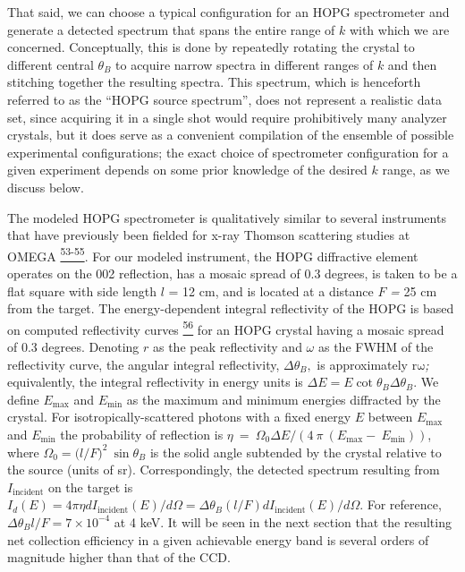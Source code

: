 That said, we can choose a typical configuration for an HOPG
spectrometer and generate a detected spectrum that spans the entire
range of \(k\) with which we are concerned. Conceptually, this is done
by repeatedly rotating the crystal to different central \(\theta_{B}\)
to acquire narrow spectra in different ranges of \(k\) and then
stitching together the resulting spectra. This spectrum, which is
henceforth referred to as the ``HOPG source spectrum'', does not
represent a realistic data set, since acquiring it in a single shot
would require prohibitively many analyzer crystals, but it does serve as
a convenient compilation of the ensemble of possible experimental
configurations; the exact choice of spectrometer configuration for a
given experiment depends on some prior knowledge of the desired \(k\)
range, as we discuss below.

The modeled HOPG spectrometer is qualitatively similar to several
instruments that have previously been fielded for x-ray Thomson
scattering studies at OMEGA
\hyperref[y.-jae-hyuck-i.-jung-bin-p.-jong-bok-j.-hojeong-and-p.-g.-costas-applied-physics-letters-100-233124-2012.]{\textsuperscript{53-55}}.
For our modeled instrument, the HOPG diffractive element operates on the
002 reflection, has a mosaic spread of 0.3 degrees, is taken to be a
flat square with side length \(l\) = 12 cm, and is located at a distance
\(F\) \emph{=} 25 cm from the target. The energy-dependent integral
reflectivity of the HOPG is based on computed reflectivity curves
\hyperref[a.-k.-freund-a.-munkholm-and-s.-brennan-optics-for-high-brightness-synchrotron-radiation-beamlines-ii-2856-68-1996.]{\textsuperscript{56}}
for an HOPG crystal having a mosaic spread of 0.3 degrees. Denoting
\(r\) as the peak reflectivity and \(\omega\) as the FWHM of the
reflectivity curve, the angular integral reflectivity,
\(\Delta\theta_{B},\) is approximately \(\text{rω}\)\emph{;}
equivalently, the integral reflectivity in energy units is
\(\Delta E = E\cot{\theta_{B}\Delta\theta_{B}}\). We define \(E_{\max}\)
and \(E_{\min}\) as the maximum and minimum energies diffracted by the
crystal. For isotropically-scattered photons with a fixed energy \(E\)
between \(E_{\max}\) and \(E_{\min}\) the probability of reflection is
\(\eta\  = \ \Omega_{0}\Delta E/(4\ \pi\ \left( E_{\max} - \ E_{\min} \right))\),
where \(\Omega_{0} = ({l/F)}^{2}\ \sin\theta_{B}\) is the solid angle
subtended by the crystal relative to the source (units of sr).
Correspondingly, the detected spectrum resulting from
\(I_{\text{incident}}\) on the target is
\(I_{d}\left( E \right) = 4\pi\eta dI_{\text{incident}}\left( E \right)/d\Omega = \Delta\theta_{B}(l/F)dI_{\text{incident}}\left( E \right)/d\Omega\).
For reference, \(\Delta\theta_{B}l/F = 7 \times 10^{- 4}\) at 4 keV. It
will be seen in the next section that the resulting net collection
efficiency in a given achievable energy band is several orders of
magnitude higher than that of the CCD.


